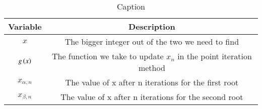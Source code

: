 \begin{table}[H]
    \centering
    \begin{tabular}{|c|c|}
         \hline
         \textbf{Variable}&\textbf{Description}\\
         \hline
         $x$& The bigger integer out of the two we need to find\\
         \hline
         $g\left(x\right)$& The function we take to update $x_n$ in the point iteration method\\
         \hline
         $x_{\alpha,n}$& The value of x after n iterations for the first root\\
         \hline
          $x_{\beta,n}$& The value of x after n iterations for the second root\\
          \hline
    \end{tabular}
    \caption{Caption}
    \label{tab:my_label}
\end{table}
